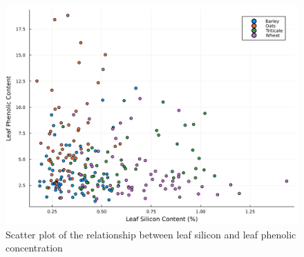 \documentclass[12pt, letterpaper, ]{report}
\begin{document}
\begin{figure}[h]
        \includegraphics[width = \textwidth]{images/phenolic_silicon_regression.png}
        \centering
        \caption{Scatter plot of the relationship between leaf silicon and leaf phenolic concentration}
        \label{Fig:phe_si_scatter}
\end{figure}
\clearpage
\end{document}
